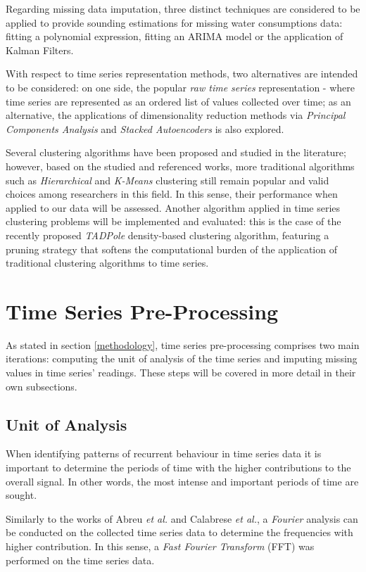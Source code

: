 \documentclass[9pt,journal,compsoc]{IEEEtran}
\begin{document}
Regarding missing data imputation, three distinct techniques are considered to be applied to provide sounding estimations for missing water consumptions data: fitting a polynomial expression, fitting an ARIMA model or the application of Kalman Filters.

With respect to time series representation methods, two alternatives are intended to be considered: on one side, the popular \emph{raw time series} representation - where time series are represented as an ordered list of values collected over time; as an alternative, the applications of dimensionality reduction methods via \emph{Principal Components Analysis} and \emph{Stacked Autoencoders} is also explored.
	
Several clustering algorithms have been proposed and studied in the literature; however, based on the studied and referenced works, more traditional algorithms such as \emph{Hierarchical} and \emph{K-Means} clustering still remain popular and valid choices among researchers in this field. In this sense, their performance when applied to our data will be assessed. Another algorithm applied in time series clustering problems will be implemented and evaluated: this is the case of the recently proposed \emph{TADPole} density-based clustering algorithm, featuring a pruning strategy that softens the computational burden of the application of traditional clustering algorithms to time series.

\section{Time Series Pre-Processing}
\label{pre_processing}

As stated in section \ref{methodology}, time series pre-processing comprises two main iterations: computing the unit of analysis of the time series and imputing missing values in time series' readings. These steps will be covered in more detail in their own subsections.

\subsection{Unit of Analysis}

When identifying patterns of recurrent behaviour in time series data it is important to determine the periods of time with the higher contributions to the overall signal. In other words, the most intense and important periods of time are sought.

Similarly to the works of Abreu \emph{et al.}\cite{abreu2012using} and Calabrese \emph{et al.}\cite{calabrese2010eigenplaces}, a \emph{Fourier} analysis can be conducted on the collected time series data to determine the frequencies with higher contribution. In this sense, a \emph{Fast Fourier  Transform} (FFT) was performed on the time series data. 
\end{document}
